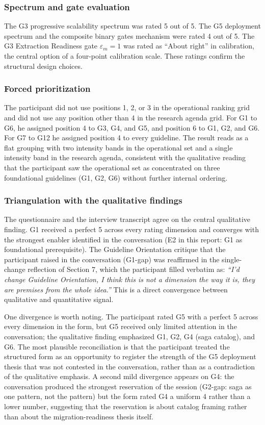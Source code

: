 \subsubsection*{Spectrum and gate evaluation}

The G3 progressive scalability spectrum was rated 5 out of 5. The G5 deployment spectrum and the composite binary gates mechanism were rated 4 out of 5. The G3 Extraction Readiness gate $\varepsilon_m = 1$ was rated as ``About right'' in calibration, the central option of a four-point calibration scale. These ratings confirm the structural design choices.

\subsubsection*{Forced prioritization}

The participant did not use positions 1, 2, or 3 in the operational ranking grid and did not use any position other than 4 in the research agenda grid. For G1 to G6, he assigned position 4 to G3, G4, and G5, and position 6 to G1, G2, and G6. For G7 to G12 he assigned position 4 to every guideline. The result reads as a flat grouping with two intensity bands in the operational set and a single intensity band in the research agenda, consistent with the qualitative reading that the participant saw the operational set as concentrated on three foundational guidelines (G1, G2, G6) without further internal ordering.

\subsubsection*{Triangulation with the qualitative findings}

The questionnaire and the interview transcript agree on the central qualitative finding. G1 received a perfect 5 across every rating dimension and converges with the strongest enabler identified in the conversation (E2 in this report: G1 as foundational prerequisite). The Guideline Orientation critique that the participant raised in the conversation (G1-gap) was reaffirmed in the single-change reflection of Section 7, which the participant filled verbatim as: \emph{``I'd change Guideline Orientation, I think this is not a dimension the way it is, they are premises from the whole idea.''} This is a direct convergence between qualitative and quantitative signal.

One divergence is worth noting. The participant rated G5 with a perfect 5 across every dimension in the form, but G5 received only limited attention in the conversation; the qualitative finding emphasized G1, G2, G4 (saga catalog), and G6. The most plausible reconciliation is that the participant treated the structured form as an opportunity to register the strength of the G5 deployment thesis that was not contested in the conversation, rather than as a contradiction of the qualitative emphasis. A second mild divergence appears on G4: the conversation produced the strongest reservation of the session (G2-gap: saga as one pattern, not the pattern) but the form rated G4 a uniform 4 rather than a lower number, suggesting that the reservation is about catalog framing rather than about the migration-readiness thesis itself.

